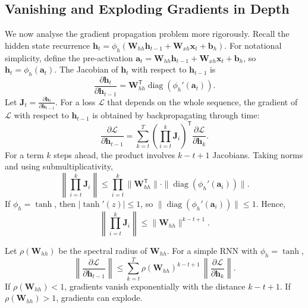 \documentclass{tufte-handout}
\begin{document}
\subsection{Vanishing and Exploding Gradients in Depth}

We now analyse the gradient propagation problem more rigorously. Recall the hidden state recurrence $\mathbf{h}_t = \phi_h(\mathbf{W}_{hh}\mathbf{h}_{t-1} + \mathbf{W}_{xh}\mathbf{x}_t + \mathbf{b}_h)$. For notational simplicity, define the pre-activation $\mathbf{a}_t = \mathbf{W}_{hh}\mathbf{h}_{t-1} + \mathbf{W}_{xh}\mathbf{x}_t + \mathbf{b}_h$, so $\mathbf{h}_t = \phi_h(\mathbf{a}_t)$. The Jacobian of $\mathbf{h}_t$ with respect to $\mathbf{h}_{t-1}$ is
\[
\frac{\partial \mathbf{h}_t}{\partial \mathbf{h}_{t-1}} = \mathbf{W}_{hh}^{\mathsf{T}} \operatorname{diag}(\phi_h'(\mathbf{a}_t)).
\]
Let $\mathbf{J}_t = \frac{\partial \mathbf{h}_t}{\partial \mathbf{h}_{t-1}}$. For a loss $\mathcal{L}$ that depends on the whole sequence, the gradient of $\mathcal{L}$ with respect to $\mathbf{h}_{t-1}$ is obtained by backpropagating through time:
\[
\frac{\partial \mathcal{L}}{\partial \mathbf{h}_{t-1}} = \sum_{k=t}^{T} \left( \prod_{i=t}^{k} \mathbf{J}_i \right)^{\mathsf{T}} \frac{\partial \mathcal{L}}{\partial \mathbf{h}_k}.
\]
For a term $k$ steps ahead, the product involves $k-t+1$ Jacobians. Taking norms and using submultiplicativity,
\[
\left\| \prod_{i=t}^{k} \mathbf{J}_i \right\| \le \prod_{i=t}^{k} \| \mathbf{W}_{hh}^{\mathsf{T}} \| \cdot \| \operatorname{diag}(\phi_h'(\mathbf{a}_i)) \|.
\]
If $\phi_h = \tanh$, then $|\tanh'(z)| \le 1$, so $\| \operatorname{diag}(\phi_h'(\mathbf{a}_i)) \| \le 1$. Hence,
\[
\left\| \prod_{i=t}^{k} \mathbf{J}_i \right\| \le \| \mathbf{W}_{hh} \|^{k-t+1}.
\]

\begin{thm}
    Let $\rho(\mathbf{W}_{hh})$ be the spectral radius of $\mathbf{W}_{hh}$. For a simple RNN with $\phi_h = \tanh$,
    \[
    \left\| \frac{\partial \mathcal{L}}{\partial \mathbf{h}_{t-1}} \right\| \le \sum_{k=t}^{T} \rho(\mathbf{W}_{hh})^{k-t+1} \, \left\| \frac{\partial \mathcal{L}}{\partial \mathbf{h}_k} \right\|.
    \]
    If $\rho(\mathbf{W}_{hh}) < 1$, gradients vanish exponentially with the distance $k-t+1$. If $\rho(\mathbf{W}_{hh}) > 1$, gradients can explode.
\end{thm}
\end{document}
